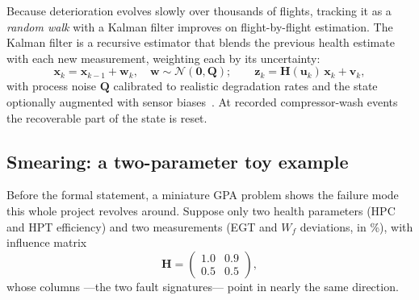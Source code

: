 Because deterioration evolves slowly over thousands of flights, tracking it as a
\emph{random walk} with a Kalman filter improves on flight-by-flight estimation. The Kalman
filter is a recursive estimator that blends the previous health estimate with each new
measurement, weighting each by its uncertainty:
\begin{equation}
  \mathbf{x}_k = \mathbf{x}_{k-1} + \mathbf{w}_k, \quad
  \mathbf{w}\sim\mathcal{N}(\mathbf{0},\mathbf{Q});
  \qquad
  \mathbf{z}_k = \mathbf{H}(\mathbf{u}_k)\,\mathbf{x}_k + \mathbf{v}_k,
  \label{eq:kalman}
\end{equation}
with process noise $\mathbf{Q}$ calibrated to realistic degradation rates and the state
optionally augmented with sensor biases~\cite{Volponi2014}. At recorded compressor-wash events
the recoverable part of the state is reset.

\subsection{Smearing: a two-parameter toy example}

Before the formal statement, a miniature GPA problem shows the failure mode this whole project
revolves around. Suppose only two health parameters (HPC and HPT efficiency) and two
measurements (EGT and $W_f$ deviations, in \%), with influence matrix
\begin{equation*}
  \mathbf{H} = \begin{pmatrix} 1.0 & 0.9 \\ 0.5 & 0.5 \end{pmatrix},
\end{equation*}
whose columns ---the two fault signatures--- point in nearly the same direction.

